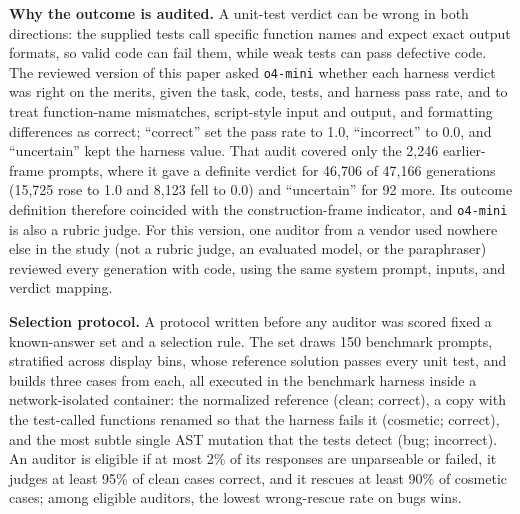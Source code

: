 \documentclass{article}
\begin{document}
\textbf{Why the outcome is audited.} A unit-test verdict can be wrong in both directions: the supplied tests call specific function names and expect exact output formats, so valid code can fail them, while weak tests can pass defective code. The reviewed version of this paper asked \texttt{o4-mini} whether each harness verdict was right on the merits, given the task, code, tests, and harness pass rate, and to treat function-name mismatches, script-style input and output, and formatting differences as correct; ``correct'' set the pass rate to 1.0, ``incorrect'' to 0.0, and ``uncertain'' kept the harness value. That audit covered only the 2{,}246 earlier-frame prompts, where it gave a definite verdict for 46{,}706 of 47{,}166 generations (15{,}725 rose to 1.0 and 8{,}123 fell to 0.0) and ``uncertain'' for 92 more. Its outcome definition therefore coincided with the construction-frame indicator, and \texttt{o4-mini} is also a rubric judge. For this version, one auditor from a vendor used nowhere else in the study (not a rubric judge, an evaluated model, or the paraphraser) reviewed every generation with code, using the same system prompt, inputs, and verdict mapping.

\textbf{Selection protocol.} A protocol written before any auditor was scored fixed a known-answer set and a selection rule. The set draws 150 benchmark prompts, stratified across display bins, whose reference solution passes every unit test, and builds three cases from each, all executed in the benchmark harness inside a network-isolated container: the normalized reference (clean; correct), a copy with the test-called functions renamed so that the harness fails it (cosmetic; correct), and the most subtle single AST mutation that the tests detect (bug; incorrect). An auditor is eligible if at most 2\% of its responses are unparseable or failed, it judges at least 95\% of clean cases correct, and it rescues at least 90\% of cosmetic cases; among eligible auditors, the lowest wrong-rescue rate on bugs wins.
\end{document}
